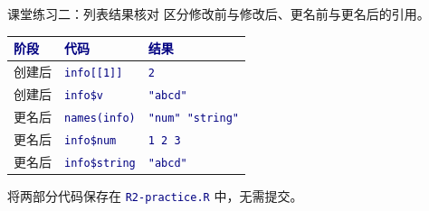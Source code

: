 \documentclass[14pt,compress,t,noamsthm,notheorem,table,handout,fontset=none]{ctexbeamer}
\newcommand{\code}[1]{\textcolor{navy}{\texttt{#1}}}
\newcommand{\thead}[1]{\textcolor{navy}{\textbf{#1}}}
\begin{document}
\begin{frame}{课堂练习二：列表结果核对}
  \small
  区分修改前与修改后、更名前与更名后的引用。
  \par\vspace{0.4em}
  \renewcommand{\arraystretch}{1.45}
  \begin{tabular*}{\linewidth}{@{\extracolsep{\fill}}lll@{}}
    \toprule
    \thead{阶段} & \thead{代码} & \thead{结果} \\
    \midrule
    创建后 & \code{info[[1]]} & \code{2} \\
    创建后 & \code{info\$v} & \code{"abcd"} \\
    更名后 & \code{names(info)} & \code{"num" "string"} \\
    更名后 & \code{info\$num} & \code{1 2 3} \\
    更名后 & \code{info\$string} & \code{"abcd"} \\
    \bottomrule
  \end{tabular*}\par
  \vfill
  将两部分代码保存在 \code{R2-practice.R} 中，无需提交。
\end{frame}
\end{document}

